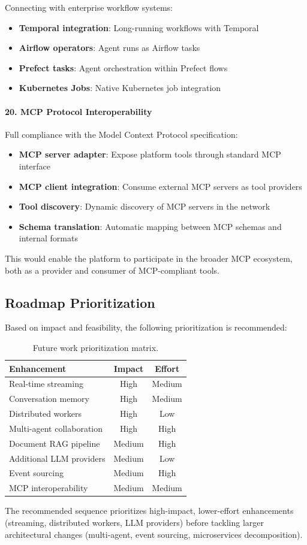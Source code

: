 Connecting with enterprise workflow systems:

\begin{itemize}
    \item \textbf{Temporal integration}: Long-running workflows with Temporal
    \item \textbf{Airflow operators}: Agent runs as Airflow tasks
    \item \textbf{Prefect tasks}: Agent orchestration within Prefect flows
    \item \textbf{Kubernetes Jobs}: Native Kubernetes job integration
\end{itemize}

\paragraph{20. MCP Protocol Interoperability}

Full compliance with the Model Context Protocol specification:

\begin{itemize}
    \item \textbf{MCP server adapter}: Expose platform tools through standard MCP interface
    \item \textbf{MCP client integration}: Consume external MCP servers as tool providers
    \item \textbf{Tool discovery}: Dynamic discovery of MCP servers in the network
    \item \textbf{Schema translation}: Automatic mapping between MCP schemas and internal formats
\end{itemize}

This would enable the platform to participate in the broader MCP ecosystem, both as a provider and consumer of MCP-compliant tools.

\subsection{Roadmap Prioritization}

Based on impact and feasibility, the following prioritization is recommended:

\begin{table}[ht]
\centering
\caption{Future work prioritization matrix.}
\label{tab:roadmap-priority}
\small
\begin{tabular}{p{5cm}cc}
\hline
\textbf{Enhancement} & \textbf{Impact} & \textbf{Effort} \\
\hline
Real-time streaming & High & Medium \\
Conversation memory & High & Medium \\
Distributed workers & High & Low \\
Multi-agent collaboration & High & High \\
Document RAG pipeline & Medium & High \\
Additional LLM providers & Medium & Low \\
Event sourcing & Medium & High \\
MCP interoperability & Medium & Medium \\
\hline
\end{tabular}
\end{table}

The recommended sequence prioritizes high-impact, lower-effort enhancements (streaming, distributed workers, LLM providers) before tackling larger architectural changes (multi-agent, event sourcing, microservices decomposition).

